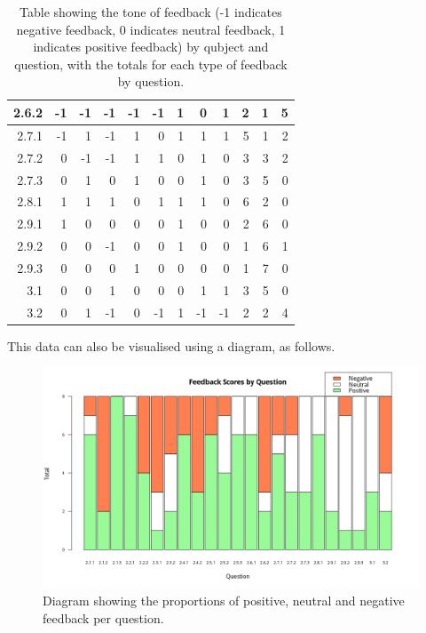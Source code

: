 \documentclass[12pt,twoside,notitlepage,xetex]{report}
\begin{document}
\begin{center}
\begin{table}[H]
\begin{center}
\begin{tabular}{|r||r|r|r|r||r|r|r|r||r|r|r|}
2.6.2 & -1 & -1 & -1 & -1 & -1 & 1 & 0 & 1 & 2 & 1 & 5\\ \hline
2.7.1 & -1 & 1 & -1 & 1 & 0 & 1 & 1 & 1 & 5 & 1 & 2\\ \hline
2.7.2 & 0 & -1 & -1 & 1 & 1 & 0 & 1 & 0 & 3 & 3 & 2\\ \hline
2.7.3 & 0 & 1 & 0 & 1 & 0 & 0 & 1 & 0 & 3 & 5 & 0\\ \hline
2.8.1 & 1 & 1 & 1 & 0 & 1 & 1 & 1 & 0 & 6 & 2 & 0\\ \hline
2.9.1 & 1 & 0 & 0 & 0 & 0 & 1 & 0 & 0 & 2 & 6 & 0\\ \hline
2.9.2 & 0 & 0 & -1 & 0 & 0 & 1 & 0 & 0 & 1 & 6 & 1\\ \hline
2.9.3 & 0 & 0 & 0 & 1 & 0 & 0 & 0 & 0 & 1 & 7 & 0\\ \hline
3.1 & 0 & 0 & 1 & 0 & 0 & 0 & 1 & 1 & 3 & 5 & 0\\ \hline
3.2 & 0 & 1 & -1 & 0 & -1 & 1 & -1 & -1 & 2 & 2 & 4\\
\hline
\end{tabular}
\end{center}
\caption{Table showing the tone of feedback (-1 indicates negative feedback, 0 indicates neutral feedback, 1 indicates positive feedback) by qubject and question, with the totals for each type of feedback by question.}
\end{table}
\end{center}

This data can also be visualised using a diagram, as follows.

\begin{center}
\begin{figure}[H]
\begin{center}
\includegraphics[width=\textwidth]{figs/graphs/stacked-scores.png}
\end{center}
\caption{Diagram showing the proportions of positive, neutral and negative feedback per question.}
\end{figure}
\end{center}
\end{document}
